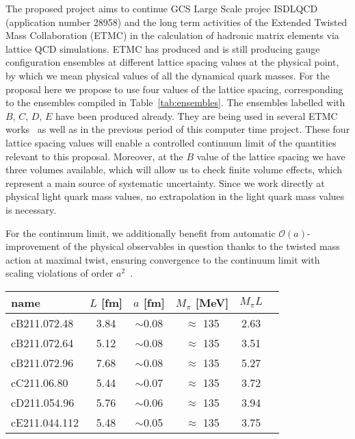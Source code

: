 
The proposed project aims to continue GCS Large Scale projec ISDLQCD
(application number 28958) and the long term activities of the
Extended Twisted Mass Collaboration (ETMC) in the calculation of
hadronic matrix elements via lattice QCD simulations. ETMC has
produced and is still producing gauge configuration ensembles at
different lattice spacing values at the physical point, by which we
mean physical values of all the dynamical quark masses. For the
proposal here we propose to use four values of the lattice spacing,
corresponding to the ensembles compiled in Table~\ref{tab:ensembles}. The
ensembles labelled with $B$, $C$, $D$, $E$ have been produced
already. They are being used in several ETMC
works~\cite{ExtendedTwistedMass:2021qui,ExtendedTwistedMass:2021gbo,ExtendedTwistedMass:2022jpw,ExtendedTwistedMassCollaborationETMC:2022sta}
as well as in the previous period of this computer time project.
These four lattice spacing values will enable a controlled continuum
limit of the quantities relevant to this proposal.
Moreover, at the $B$ value of the lattice spacing we have
three volumes available, which will allow us to check finite volume
effects, which represent a main source of systematic uncertainty.
Since we work directly at physical light quark mass values, no
extrapolation in the light quark mass values is necessary.

For the continuum limit, we additionally benefit from automatic
$\mathcal{O}(a)$-improvement of the physical observables in question
thanks to the twisted mass action at
maximal twist, ensuring convergence to the continuum
limit with scaling violations of order $a^2$~\cite{Frezzotti:2003ni}.

\begin{SCtable}[.4]           
  \centering %
  \begin{tabular}{lccccr} %
    \toprule
    name          & $L$ [fm]      & $a$
    [fm]          & $M_\pi$ [MeV] & $M_\pi L$                         \\
    \midrule
    \midrule
    cB211.072.48  & 3.84          & $\sim$0.08 & $\approx$ 135 & 2.63 \\
    cB211.072.64  & 5.12          & $\sim$0.08 & $\approx$ 135 & 3.51 \\
    cB211.072.96  & 7.68          & $\sim$0.08 & $\approx$ 135 & 5.27 \\
    \hline
    cC211.06.80   & 5.44          & $\sim$0.07 & $\approx$ 135 & 3.72 \\
    \hline
    cD211.054.96  & 5.76          & $\sim$0.06 & $\approx$ 135 & 3.94 \\
    \hline
    cE211.044.112 & 5.48          & $\sim$0.05 & $\approx$ 135 & 3.75 \\
    \bottomrule
  \end{tabular}
  \caption{ETMC's $N_f=2+1+1$ gauge ensembles relevant for this
    proposal. The time extent is always set to $T=2L$.}
  \label{tab:ensembles}
\end{SCtable}

